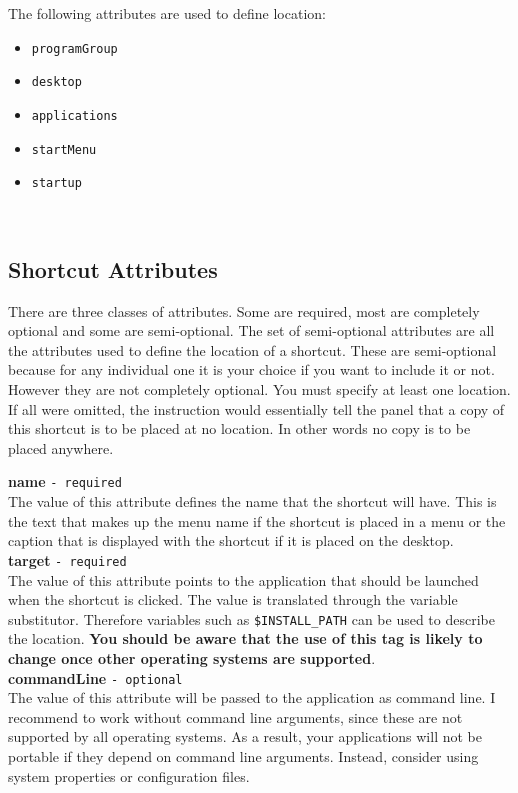 The following attributes are used to define location:
\begin{itemize}
\item \texttt{programGroup}
\item \texttt{desktop}
\item \texttt{applications}
\item \texttt{startMenu}
\item \texttt{startup}
\end{itemize}\

\subsection{Shortcut Attributes}

There are three classes of attributes. Some are required, most are
completely optional and some are semi-optional. The set of semi-optional
attributes are all the attributes used to define the location of a
shortcut. These are semi-optional because for any individual one it is
your choice if you want to include it or not. However they are not
completely optional. You must specify at least one location. If all were
omitted, the instruction would essentially tell the panel that a copy of
this shortcut is to be placed at no location. In other words no copy is
to be placed anywhere.

\textbf{name} \texttt{- required}\\

The value of this attribute defines the name that the shortcut will
have. This is the text that makes up the menu name if the shortcut is
placed in a menu or the caption that is displayed with the shortcut if
it is placed on the desktop.\\

\textbf{target} \texttt{- required}\\

The value of this attribute points to the application that should be
launched when the shortcut is clicked. The value is translated through
the variable substitutor. Therefore variables such as
\texttt{\$INSTALL\_PATH} can be used to describe the location.
\textbf{You should be aware that the use of this tag is likely to change
once other operating systems are supported}.\\

\textbf{commandLine} \texttt{- optional}\\

The value of this attribute will be passed to the application as command
line. I recommend to work without command line arguments, since these are
not supported by all operating systems. As a result, your applications
will not be portable if they depend on command line arguments. Instead,
consider using system properties or configuration files.\\


